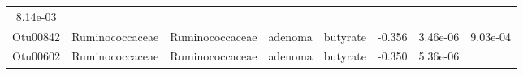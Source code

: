 \documentclass[11pt,]{article}
\begin{document}
\begin{longtable}[]{@{}cccccccc@{}}
\begin{minipage}[t]{0.08\columnwidth}
8.14e-03\strut
\end{minipage}\tabularnewline
\begin{minipage}[t]{0.08\columnwidth}\centering\strut
Otu00842\strut
\end{minipage} & \begin{minipage}[t]{0.15\columnwidth}\centering\strut
Ruminococcaceae\strut
\end{minipage} & \begin{minipage}[t]{0.15\columnwidth}\centering\strut
Ruminococcaceae\strut
\end{minipage} & \begin{minipage}[t]{0.08\columnwidth}\centering\strut
adenoma\strut
\end{minipage} & \begin{minipage}[t]{0.09\columnwidth}\centering\strut
butyrate\strut
\end{minipage} & \begin{minipage}[t]{0.07\columnwidth}\centering\strut
-0.356\strut
\end{minipage} & \begin{minipage}[t]{0.08\columnwidth}\centering\strut
3.46e-06\strut
\end{minipage} & \begin{minipage}[t]{0.08\columnwidth}\centering\strut
9.03e-04\strut
\end{minipage}\tabularnewline
\begin{minipage}[t]{0.08\columnwidth}\centering\strut
Otu00602\strut
\end{minipage} & \begin{minipage}[t]{0.15\columnwidth}\centering\strut
Ruminococcaceae\strut
\end{minipage} & \begin{minipage}[t]{0.15\columnwidth}\centering\strut
Ruminococcaceae\strut
\end{minipage} & \begin{minipage}[t]{0.08\columnwidth}\centering\strut
adenoma\strut
\end{minipage} & \begin{minipage}[t]{0.09\columnwidth}\centering\strut
butyrate\strut
\end{minipage} & \begin{minipage}[t]{0.07\columnwidth}\centering\strut
-0.350\strut
\end{minipage} & \begin{minipage}[t]{0.08\columnwidth}\centering\strut
5.36e-06\strut
\end{minipage} & \begin{minipage}[t]{0.08\columnwidth}\centering\strut

\end{minipage}
\end{longtable}
\end{document}
